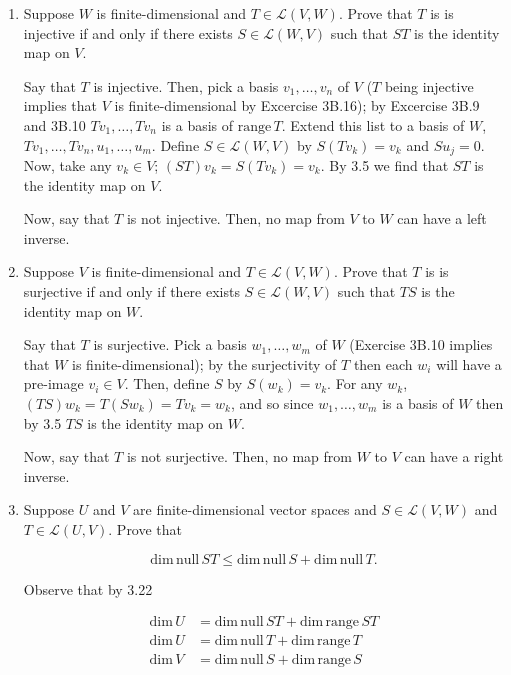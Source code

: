 \documentclass{book}
\begin{document}
\begin{enumerate}
\item Suppose \(W\) is finite-dimensional and \(T \in \mathcal{L}(V,W)\).  Prove that \(T\) is is injective if and only if there exists \(S \in \mathcal{L}(W,V)\) such that \(ST\) is the identity map on \(V\).

Say that \(T\) is injective.  Then, pick a basis \(v_1,\dots,v_n\) of \(V\) (\(T\) being injective implies that \(V\) is finite-dimensional by Excercise 3B.16); by Excercise 3B.9 and 3B.10 \(Tv_1,\dots,Tv_n\) is a basis of \(\textrm{range} \, T\).  Extend this list to a basis of \(W\), \(Tv_1,\dots,Tv_n,u_1,\dots,u_m\).  Define \(S \in \mathcal{L}(W,V)\) by \(S(Tv_k)=v_k\) and \(Su_j=0\).  Now, take any \(v_k \in V\); \((ST)v_k=S(Tv_k)=v_k\).  By 3.5 we find that \(ST\) is the identity map on \(V\).

Now, say that \(T\) is not injective.  Then, no map from \(V\) to \(W\) can have a left inverse.

\item Suppose \(V\) is finite-dimensional and \(T \in \mathcal{L}(V,W)\).  Prove that \(T\) is is surjective if and only if there exists \(S \in \mathcal{L}(W,V)\) such that \(TS\) is the identity map on \(W\).

Say that \(T\) is surjective.  Pick a basis \(w_1,\dots,w_m\) of \(W\) (Exercise 3B.10 implies that \(W\) is finite-dimensional); by the surjectivity of \(T\) then each \(w_i\) will have a pre-image \(v_i \in V\).  Then, define \(S\) by \(S(w_k)=v_k\).  For any \(w_k\), \((TS)w_k=T(Sw_k)=Tv_k=w_k\), and so since \(w_1,\dots,w_m\) is a basis of \(W\) then by 3.5 \(TS\) is the identity map on \(W\).

Now, say that \(T\) is not surjective.  Then, no map from \(W\) to \(V\) can have a right inverse.

\item Suppose \(U\) and \(V\) are finite-dimensional vector spaces and \(S \in \mathcal{L}(V,W)\) and \(T \in \mathcal{L}(U,V)\).  Prove that

\begin{equation*}
    \textrm{dim} \, \textrm{null} \, ST \leq \textrm{dim} \, \textrm{null} \, S+\textrm{dim} \, \textrm{null} \, T.
\end{equation*}

Observe that by 3.22

\begin{equation*}
    \begin{split}
        \textrm{dim} \, U &= \textrm{dim} \, \textrm{null} \, ST + \textrm{dim} \, \textrm{range} \, ST \\
        \textrm{dim} \, U &= \textrm{dim} \, \textrm{null} \, T + \textrm{dim} \, \textrm{range} \, T \\
        \textrm{dim} \, V &= \textrm{dim} \, \textrm{null} \, S + \textrm{dim} \, \textrm{range} \, S
    \end{split}
\end{equation*}


\end{enumerate}
\end{document}

